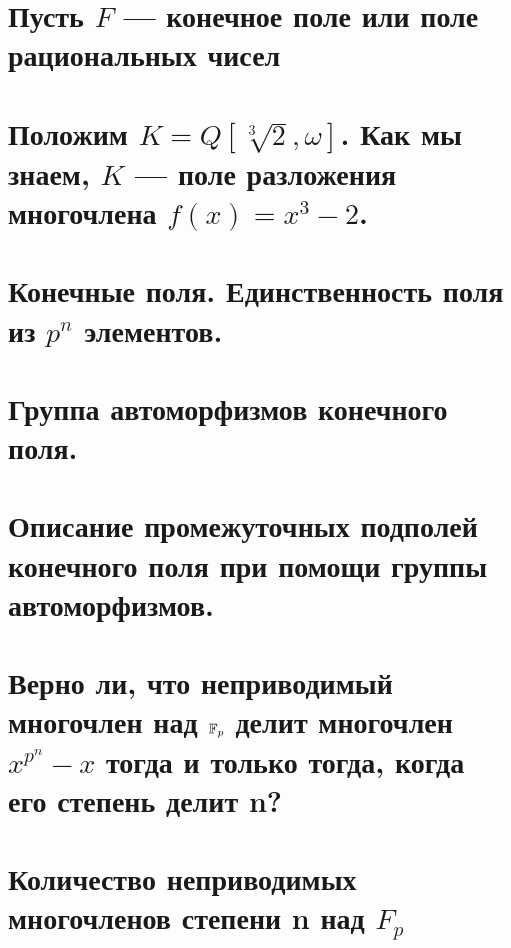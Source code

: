 \section{Пусть $F$ — конечное поле или поле рациональных чисел}

\newpage{}

\section{Положим $K = Q[\sqrt[3]{2}, \omega]$. Как мы знаем, $K$ — поле разложения многочлена $f(x) = x^3 − 2$.}

\newpage{}

\section{Конечные поля. Единственность поля из $p^n$ элементов.}


\section{Группа автоморфизмов конечного поля.}


\section{Описание промежуточных подполей конечного поля при помощи группы автоморфизмов.}

\newpage{}

\section{Верно ли, что неприводимый многочлен над $\mathbb{F}_p$ делит многочлен $x^{p^n} - x$ тогда и только тогда, когда его степень делит n?}


\section{Количество неприводимых многочленов степени n над $F_p$}

\newpage{}